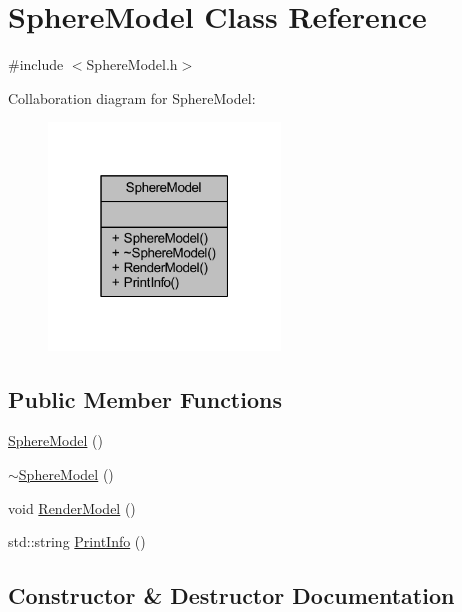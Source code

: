 \hypertarget{class_sphere_model}{}\section{Sphere\+Model Class Reference}
\label{class_sphere_model}


{\ttfamily \#include $<$Sphere\+Model.\+h$>$}



Collaboration diagram for Sphere\+Model\+:\nopagebreak
\begin{figure}[H]
\begin{center}
\leavevmode
\includegraphics[width=175pt]{class_sphere_model__coll__graph}
\end{center}
\end{figure}
\subsection*{Public Member Functions}
\begin{DoxyCompactItemize}
\item 
\mbox{\hyperlink{class_sphere_model_a9442478e1ae463b984086c67e727f8a0}{Sphere\+Model}} ()
\item 
\mbox{\hyperlink{class_sphere_model_a7aefce5e0d8b54ffd42287b85b0e684c}{$\sim$\+Sphere\+Model}} ()
\item 
void \mbox{\hyperlink{class_sphere_model_a3ac469e318f16ff912f6c50e9304c2a3}{Render\+Model}} ()
\item 
std\+::string \mbox{\hyperlink{class_sphere_model_a55d41706d2e3f67bb0401d361cc4a426}{Print\+Info}} ()
\end{DoxyCompactItemize}


\subsection{Constructor \& Destructor Documentation}
\mbox{\label{class_sphere_model_a9442478e1ae463b984086c67e727f8a0}} 

